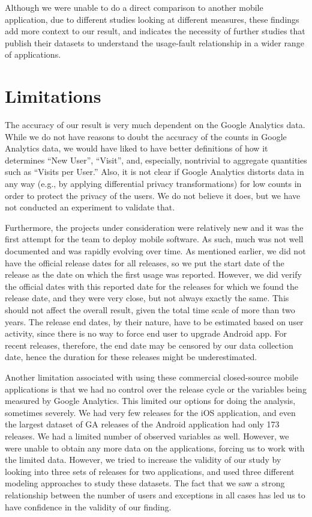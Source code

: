 \documentclass[smallcondensed]{svjour3}     %
\begin{document}
Although we were unable to do a direct comparison to another mobile application, due to different studies looking at different measures, these findings add more context to our result, and indicates the necessity of further studies that publish their datasets to understand the usage-fault relationship in a wider range of applications.


\section{Limitations}\label{s:limitation}

The accuracy of our result is very much dependent on the Google
Analytics data. While we do not have reasons to doubt the accuracy of
the counts in Google
Analytics data, we would have liked to have better definitions of
how it determines ``New User'', ``Visit'', and, especially,
nontrivial to aggregate quantities such as ``Visits per User.'' Also,
it is not clear if Google
Analytics distorts data in any way (e.g., by applying differential 
privacy transformations) for low counts in order to protect
the privacy of the users. We do not believe it does, but we have not
conducted an experiment to validate that. 

Furthermore, the projects under consideration were relatively new and
it was the first attempt for the team to deploy mobile software. As
such, much was not well documented and was rapidly
evolving over time. As mentioned earlier, we did not have the official release
dates for all releases, so we put the start date of the release as
the date on which the first usage was reported. However, we did
verify the official dates with this reported date for the releases
for which we found the release date, and they were very close, but
not always exactly the same. This should not affect
the overall result, given the total time scale of more than two
years. The release end dates, by their nature, have to be estimated 
based on user activity, since there is no way to force end user
to upgrade Android app. For recent releases, therefore, the end date 
may be censored by our data
collection date, hence the duration for these releases might be
underestimated. 

Another limitation associated with using these commercial closed-source 
mobile applications is that we had no control over the release cycle or the
variables being measured by Google Analytics. This limited our options for 
doing the analysis, sometimes 
severely. We had very few releases for the iOS application, and even the largest
dataset of GA releases of the Android application had only 173 releases. We had 
a limited number of observed variables as well. However, we were unable to obtain
any more data on the applications, forcing us to work with the limited data. 
However, we tried to increase the validity of our study by looking into three 
sets of releases for two applications, and used three different modeling approaches 
to study these datasets. The fact that we saw a strong relationship between the number
of users and exceptions in all cases has led us to have confidence in the validity
of our finding. 
\end{document}
